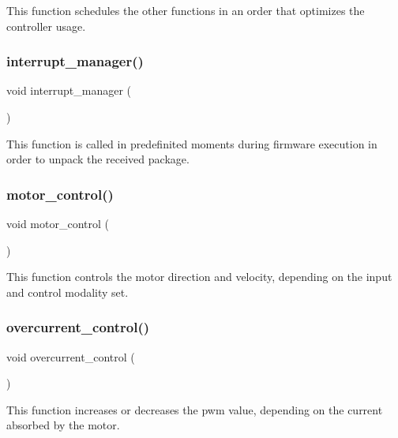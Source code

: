 This function schedules the other functions in an order that optimizes the controller usage. \mbox{\label{interruptions_8c_a9790811526002d99b25a814afd02cbae}} 
\subsubsection{interrupt\+\_\+manager()}
{\footnotesize\ttfamily void interrupt\+\_\+manager (\begin{DoxyParamCaption}{ }\end{DoxyParamCaption})}

This function is called in predefinited moments during firmware execution in order to unpack the received package. \mbox{\label{interruptions_8c_a8c7c487a5a127331b0de53443e3ca964}} 
\subsubsection{motor\+\_\+control()}
{\footnotesize\ttfamily void motor\+\_\+control (\begin{DoxyParamCaption}{ }\end{DoxyParamCaption})}

This function controls the motor direction and velocity, depending on the input and control modality set. \mbox{\label{interruptions_8c_a4e92908805632dc8cab2936d89bb3ba1}} 
\subsubsection{overcurrent\+\_\+control()}
{\footnotesize\ttfamily void overcurrent\+\_\+control (\begin{DoxyParamCaption}{ }\end{DoxyParamCaption})}

This function increases or decreases the pwm value, depending on the current absorbed by the motor. \mbox{\label{interruptions_8c_ab7b287cf5df2ea548297b951be2f20d4}} 

